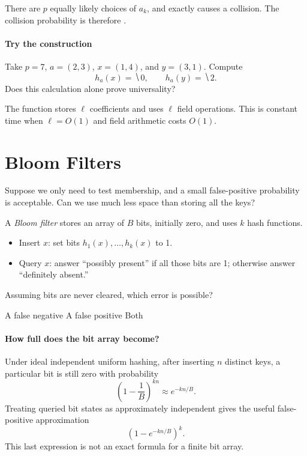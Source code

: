 \documentclass[11pt]{article}
\begin{document}
There are $p$ equally likely choices of $a_k$, and exactly
 causes a collision. The collision probability is therefore
.

\paragraph{Try the construction}
Take $p=7$, $a=(2,3)$, $x=(1,4)$, and $y=(3,1)$. Compute
\begin{equation*}
    h_a(x)=\hide{0},\qquad h_a(y)=\hide{2}.
\end{equation*}
Does this calculation alone prove universality?
\vs{.6cm}

\vfill
The function stores $\ell$ coefficients and uses $\ell$ field operations.
This is constant time when $\ell=O(1)$ and field arithmetic costs $O(1)$.

\newpage
\section*{Bloom Filters}
Suppose we only need to test membership, and a small false-positive probability
is acceptable. Can we use much less space than storing all the keys?

A \emph{Bloom filter} stores an array of $B$ bits, initially zero, and uses
$k$ hash functions.
\begin{itemize}
    \item Insert $x$: set bits $h_1(x),\ldots,h_k(x)$ to 1.
    \item Query $x$: answer ``possibly present'' if all those bits are 1;
    otherwise answer ``definitely absent.''
\end{itemize}

\begin{Qu}
    Assuming bits are never cleared, which error is possible?
    \begin{itemize}
        \aitem A false negative
        \bitem A false positive
        \citem Both
    \end{itemize}
\end{Qu}

\paragraph{How full does the bit array become?}
Under ideal independent uniform hashing, after inserting $n$ distinct keys,
a particular bit is still zero with probability
\begin{equation*}
    \left(1-\frac1B\right)^{kn}\approx e^{-kn/B}.
\end{equation*}
Treating queried bit states as approximately independent gives the useful
false-positive approximation
\begin{equation*}
    \left(1-e^{-kn/B}\right)^k.
\end{equation*}
This last expression is not an exact formula for a finite bit array.
\end{document}
